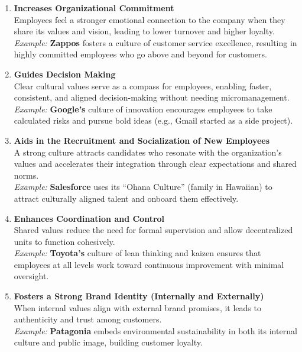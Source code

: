 \documentclass[10pt,a4paper]{book}
\begin{document}
\begin{enumerate}
    \item \textbf{Increases Organizational Commitment} \\
    Employees feel a stronger emotional connection to the company when they share its values and vision, leading to lower turnover and higher loyalty.\\
    \textit{Example:} \textbf{Zappos} fosters a culture of customer service excellence, resulting in highly committed employees who go above and beyond for customers.

    \item \textbf{Guides Decision Making} \\
    Clear cultural values serve as a compass for employees, enabling faster, consistent, and aligned decision-making without needing micromanagement.\\
    \textit{Example:} \textbf{Google's} culture of innovation encourages employees to take calculated risks and pursue bold ideas (e.g., Gmail started as a side project).

    \item \textbf{Aids in the Recruitment and Socialization of New Employees} \\
    A strong culture attracts candidates who resonate with the organization’s values and accelerates their integration through clear expectations and shared norms.\\
    \textit{Example:} \textbf{Salesforce} uses its “Ohana Culture” (family in Hawaiian) to attract culturally aligned talent and onboard them effectively.

    \item \textbf{Enhances Coordination and Control} \\
    Shared values reduce the need for formal supervision and allow decentralized units to function cohesively.\\
    \textit{Example:} \textbf{Toyota’s} culture of lean thinking and kaizen ensures that employees at all levels work toward continuous improvement with minimal oversight.

    \item \textbf{Fosters a Strong Brand Identity (Internally and Externally)} \\
    When internal values align with external brand promises, it leads to authenticity and trust among customers.\\
    \textit{Example:} \textbf{Patagonia} embeds environmental sustainability in both its internal culture and public image, building customer loyalty.


\end{enumerate}
\end{document}
